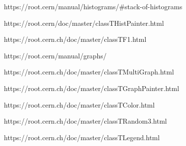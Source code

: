 https://root.cern/manual/histograms/#stack-of-histograms

https://root.cern/doc/master/classTHistPainter.html

https://root.cern.ch/doc/master/classTF1.html

https://root.cern/manual/graphs/

https://root.cern.ch/doc/master/classTMultiGraph.html

https://root.cern.ch/doc/master/classTGraphPainter.html

https://root.cern.ch/doc/master/classTColor.html

https://root.cern.ch/doc/master/classTRandom3.html

https://root.cern.ch/doc/master/classTLegend.html